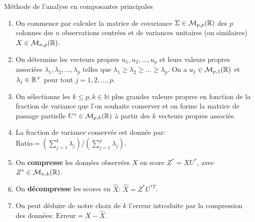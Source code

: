 \begin{frame}{Méthode de l'analyse en composantes principales}
	\begin{enumerate}
		\item On commence par calculer la matrice de covariance $\Sigma \in \mathcal{M}_{p,p}(\mathbb{R})$ des $p$ colonnes des $n$ observations centrées et de variances unitaires (ou similaires) $X \in \mathcal{M}_{n,p}(\mathbb{R})$.
		\pause
		\item On détermine les vecteurs propres $u_1, u_2, \dots, u_p$ et leurs valeurs propres associées $\lambda_1, \lambda_2, \dots, \lambda_p$ telles que $\lambda_1 \ge \lambda_2 \ge \dots \ge \lambda_p$. On a $u_j \in \mathcal{M}_{p,1}(\mathbb{R})$ et $\lambda_j \in \mathbb{R}^+$ pour tout $j=1, 2, \dots, p$.
		\pause
		\item On sélectionne les $k \le p, k \in \mathbb{N}$ plus grandes valeurs propres en fonction de la fraction de variance que l'on souhaite conserver et on forme la matrice de passage partielle $U^* \in \mathcal{M}_{p,k}(\mathbb{R})$ à partir des $k$ vecteurs propres associés.
		\pause
		\item La fraction de variance conservée est donnée par: $\text{Ratio} = \left(\sum_{j=1}^k \lambda_j\right) / \left(\sum_{j=1}^p \lambda_j\right)$.
		\pause
		\item On \textbf{compresse} les données observées $X$ en score $Z^* = X U^*$, avec $Z^* \in \mathcal{M}_{n,k}(\mathbb{R})$.
		\pause
		\item On \textbf{décompresse} les scores en $\hat{X}$: $\hat{X} = Z^* U^{*T}$.
		\pause
		\item On peut déduire de notre choix de $k$ l'erreur introduite par la compression des données: $\text{Erreur} = X - \hat{X}$.
	\end{enumerate}
\end{frame}

